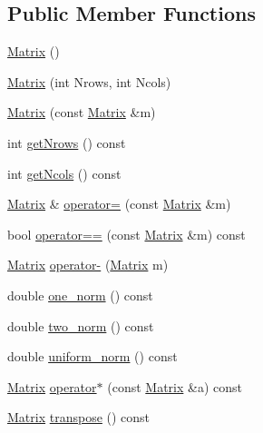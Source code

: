 \subsection*{Public Member Functions}
\begin{DoxyCompactItemize}
\item 
\mbox{\hyperlink{class_matrix_a2dba13c45127354c9f75ef576f49269b}{Matrix}} ()
\item 
\mbox{\hyperlink{class_matrix_a135a15de1126d735bb95fcc839d739d7}{Matrix}} (int Nrows, int Ncols)
\item 
\mbox{\hyperlink{class_matrix_a765f4dcb51b6829311cc3e7576388423}{Matrix}} (const \mbox{\hyperlink{class_matrix}{Matrix}} \&m)
\item 
int \mbox{\hyperlink{class_matrix_a711f84a1c62832d9d197d78c9855a276}{get\+Nrows}} () const
\item 
int \mbox{\hyperlink{class_matrix_ae0a5f2154953b8d129a90b04f91d9079}{get\+Ncols}} () const
\item 
\mbox{\hyperlink{class_matrix}{Matrix}} \& \mbox{\hyperlink{class_matrix_aea5a06385f646eb4a63929fae6fa3e14}{operator=}} (const \mbox{\hyperlink{class_matrix}{Matrix}} \&m)
\item 
bool \mbox{\hyperlink{class_matrix_a35097c20bcb1495b57d452db0d7b1f53}{operator==}} (const \mbox{\hyperlink{class_matrix}{Matrix}} \&m) const
\item 
\mbox{\hyperlink{class_matrix}{Matrix}} \mbox{\hyperlink{class_matrix_a2aabf841a4302d528f8b102c0800a263}{operator-\/}} (\mbox{\hyperlink{class_matrix}{Matrix}} m)
\item 
double \mbox{\hyperlink{class_matrix_af4d468252f3ecbbcaa5726c76e332b4c}{one\+\_\+norm}} () const
\item 
double \mbox{\hyperlink{class_matrix_aac496af05ec7aa26afc2b9c6d0ab8b66}{two\+\_\+norm}} () const
\item 
double \mbox{\hyperlink{class_matrix_a43066c7fe6418aad40170b85415063e8}{uniform\+\_\+norm}} () const
\item 
\mbox{\hyperlink{class_matrix}{Matrix}} \mbox{\hyperlink{class_matrix_aaa40c78e6b3bb5bbf572d35612dbf6a7}{operator$\ast$}} (const \mbox{\hyperlink{class_matrix}{Matrix}} \&a) const
\item 
\mbox{\hyperlink{class_matrix}{Matrix}} \mbox{\hyperlink{class_matrix_a759661b75b9681f3a89ff75e27933b3a}{transpose}} () const
\end{DoxyCompactItemize}
